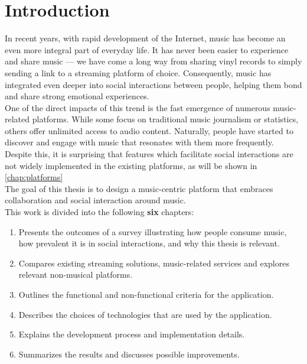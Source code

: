 \chapter{Introduction}\label{chap:intro}


In recent years, with rapid development of the Internet,
music has become an even more integral part of everyday life.\cite{music_role_life}
It has never been easier to experience and share music — we have come
a long way from sharing vinyl records to simply sending a link to a streaming platform of choice.
Consequently, music has integrated even deeper into social interactions between people,
helping them bond and share strong emotional experiences.\cite{music_role_life}
\\
One of the direct impacts of this trend is the fast emergence of numerous music-related platforms.
While some focus on traditional music journalism or statistics, others offer unlimited access to audio content.
Naturally, people have started to discover and engage with music that resonates with them more frequently.\cite{music_role_life}
\\
Despite this, it is surprising that features which facilitate social interactions are not widely implemented in the
existing platforms, as will be shown in \autoref{chap:platforms}
\\
The goal of this thesis is to design a music-centric platform that embraces
collaboration and social interaction around music.
\\
This work is divided into the following \textbf{six} chapters:

\begin{enumerate}
    \item \textbf{}
    Presents the outcomes of a survey illustrating how people consume music,
    how prevalent it is in social interactions, and why this thesis is relevant.

    \item \textbf{}
    Compares existing streaming solutions, music-related services
    and explores relevant non-musical platforms.

    \item \textbf{}
    Outlines the functional and non-functional criteria for the application.

    \item \textbf{}
    Describes the choices of technologies that are used by the application.

    \item \textbf{}
    Explains the development process and implementation details.

    \item \textbf{}
    Summarizes the results and discusses possible improvements.
\end{enumerate}